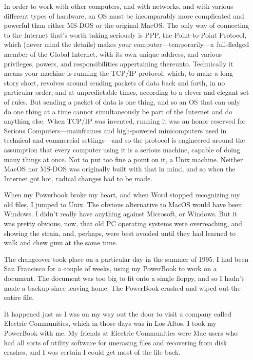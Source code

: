 \documentclass[
  fontsize=11pt,
  paper=landscape,
  twocolumn=true,
  pagesize=pdftex,
  headings=small,
  DIV=15,
  ]{scrartcl}
\begin{document}
In order to work with other computers, and with networks, and with
various different types of hardware, an OS must be incomparably more
complicated and powerful than either MS-DOS or the original MacOS. The
only way of connecting to the Internet that's worth taking seriously is
PPP, the Point-to-Point Protocol, which (never mind the details) makes
your computer---temporarily---a full-fledged member of the Global
Internet, with its own unique address, and various privileges, powers,
and responsibilities appertaining thereunto. Technically it means your
machine is running the TCP/IP protocol, which, to make a long story
short, revolves around sending packets of data back and forth, in no
particular order, and at unpredictable times, according to a clever and
elegant set of rules. But sending a packet of data is one thing, and so
an OS that can only do one thing at a time cannot simultaneously be part
of the Internet and do anything else. When TCP/IP was invented, running
it was an honor reserved for Serious Computers---mainframes and
high-powered minicomputers used in technical and commercial
settings---and so the protocol is engineered around the assumption that
every computer using it is a serious machine, capable of doing many
things at once. Not to put too fine a point on it, a Unix machine.
Neither MacOS nor MS-DOS was originally built with that in mind, and so
when the Internet got hot, radical changes had to be made.

When my Powerbook broke my heart, and when Word stopped recognizing my
old files, I jumped to Unix. The obvious alternative to MacOS would have
been Windows. I didn't really have anything against Microsoft, or
Windows. But it was pretty obvious, now, that old PC operating systems
were overreaching, and showing the strain, and, perhaps, were best
avoided until they had learned to walk and chew gum at the same time.

The changeover took place on a particular day in the summer of 1995. I
had been San Francisco for a couple of weeks, using my PowerBook to work
on a document. The document was too big to fit onto a single floppy, and
so I hadn't made a backup since leaving home. The PowerBook crashed and
wiped out the entire file.

It happened just as I was on my way out the door to visit a company
called Electric Communities, which in those days was in Los Altos. I
took my PowerBook with me. My friends at Electric Communities were Mac
users who had all sorts of utility software for unerasing files and
recovering from disk crashes, and I was certain I could get most of the
file back.
\end{document}

